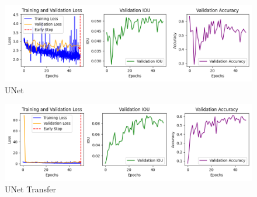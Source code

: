 \begin{figure}[H]
	\centering
	\includegraphics[width=\textwidth]{plots/unet}
	\caption{UNet}
	\label{fig:unet}
\end{figure}

\begin{figure}[H]
	\centering
	\includegraphics[width=\textwidth]{plots/unet_transfer}
	\caption{UNet Transfer}
	\label{fig:unet_transfer}
\end{figure}
